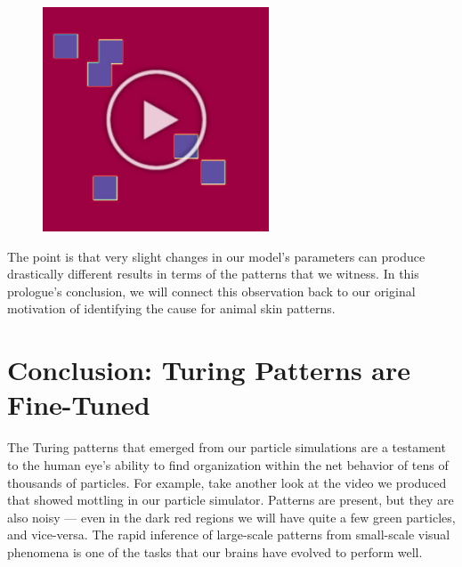 {{\begin{figure}[h]
\centering
\mySfFamily
\includegraphics[width = 0.6\textwidth]{../images/gray-scott_f42_k59_first_frame.png}
\caption{}
\label{fig:gray-scott_f42_k59_first_frame}
\end{figure}

The point is that very slight changes in our model's parameters can produce drastically different results in terms of the patterns that we witness. In this prologue's conclusion, we will connect this observation back to our original motivation of identifying the cause for animal skin patterns.



















\FloatBarrier
{}

\section{Conclusion: Turing Patterns are Fine-Tuned}
\label{sec:conclusion:_turing_patterns_are_fine-tuned}


The Turing patterns that emerged from our particle simulations are a testament to the human eye's ability to find organization within the net behavior of tens of thousands of particles. For example, take another look at the video we produced that showed mottling in our particle simulator. Patterns are present, but they are also noisy --- even in the dark red regions we will have quite a few green particles, and vice-versa. The rapid inference of large-scale patterns from small-scale visual phenomena is one of the tasks that our brains have evolved to perform well.

}}
